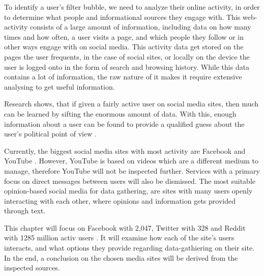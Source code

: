 
To identify a user's filter bubble, we need to analyze their online activity, in
order to determine what people and informational sources they engage with. This
web-activity consists of a large amount of information, including data on how
many times and how often, a user visits a page, and which people they follow or
in other ways engage with on social media. This activity data get stored on the
pages the user frequents, in the case of social sites, or locally on the device
the user is logged onto in the form of search and browsing history. While this
data contains a lot of information, the raw nature of it makes it require
extensive analysing to get useful information.\nl

Research shows, that if given a fairly active user on social media sites, then
much can be learned by sifting the enormous amount of data. With this, enough
information about a user can be found to provide a qualified guess about the
user's political point of view \citep{Personality} \KT.\nl

Currently, the biggest social media sites with most activity are Facebook and
YouTube \citep{SocialMediaStats}. However, YouTube is based on videos which are
a different medium to manage, therefore YouTube will not be inspected further.
Services with a primary focus on direct messages between users will also be
dismissed. The most suitable opinion-based social media for data gathering, are
sites with many users openly interacting with each other, where opinions and
information gets provided through text.\nl

This chapter will focus on Facebook with 2,047, Twitter with 328 and Reddit with
1285 million activ users \citep{FacebookPopularity}. It will examine how each of
the site's users interacts, and what options they provide regarding data-gathiering
on their site. In the end, a conclusion on the chosen media sites will be
derived from the inspected sources.